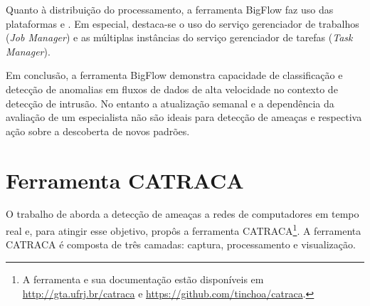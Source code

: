 
Quanto à distribuição do processamento,
a ferramenta BigFlow faz uso das plataformas \flink e \kafka.
Em especial, destaca-se o uso do serviço gerenciador de trabalhos (\emph{Job
Manager}) e as múltiplas instâncias do serviço gerenciador de tarefas
(\emph{Task Manager}).


Em conclusão, a ferramenta BigFlow demonstra capacidade de classificação e
detecção de anomalias em fluxos de dados de alta velocidade no contexto de
detecção de intrusão.
No entanto a atualização semanal e a dependência da avaliação de um especialista
não são ideais para detecção de ameaças e respectiva ação sobre a descoberta de
novos padrões.


\section{Ferramenta CATRACA}

O trabalho de  aborda a detecção de ameaças a redes de
computadores em tempo real e, para atingir esse objetivo, propôs a ferramenta
CATRACA\footnote{
    A ferramenta e sua documentação estão disponíveis em
    \url{http://gta.ufrj.br/catraca}
    e \url{https://github.com/tinchoa/catraca}.
}.
A ferramenta CATRACA é composta de três camadas: captura, processamento e
visualização.

